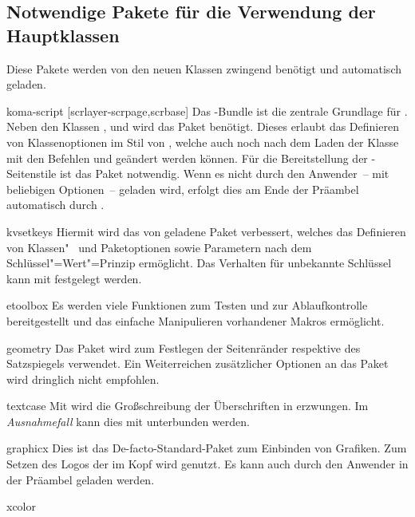 \subsection{Notwendige Pakete für die Verwendung der Hauptklassen}
Diese Pakete werden von den neuen Klassen zwingend benötigt und automatisch 
geladen.
%
\begin{packages}
\item[koma-script][scrlayer-scrpage,scrbase]
  Das \KOMAScript-Bundle ist die zentrale Grundlage für \TUDScript. Neben den 
  Klassen ,  und  wird das Paket 
   benötigt. Dieses erlaubt das Definieren von Klassenoptionen 
  im Stil von \KOMAScript, welche auch noch nach dem Laden der Klasse mit den 
  Befehlen  und  geändert werden können. Für 
  die Bereitstellung der -Seitenstile ist das Paket 
   notwendig. Wenn es nicht durch den Anwender~-- mit 
  beliebigen Optionen~-- geladen wird, erfolgt dies am Ende der Präambel 
  automatisch durch \TUDScript.
\item[kvsetkeys]
  Hiermit wird das von  geladene Paket  
  verbessert, welches das Definieren von Klassen"~ und Paketoptionen sowie 
  Parametern nach dem Schlüssel"=Wert"=Prinzip ermöglicht. Das Verhalten für 
  unbekannte Schlüssel  kann mit  festgelegt werden.
\item[etoolbox]
  Es werden viele Funktionen zum Testen und zur Ablaufkontrolle bereitgestellt 
  und das einfache Manipulieren vorhandener Makros ermöglicht.
\item[geometry]
  Das Paket wird zum Festlegen der Seitenränder respektive des Satzspiegels 
  verwendet. Ein Weiterreichen zusätzlicher Optionen an das Paket wird 
  dringlich nicht empfohlen.
\item[textcase]
  Mit  wird die Großschreibung der Überschriften in 
  \DIN erzwungen. Im \emph{Ausnahmefall} kann dies mit  
  unterbunden werden.
\item[graphicx]
  Dies ist das De-facto-Standard-Paket zum Einbinden von Grafiken. Zum Setzen 
  des Logos der \TnUD im Kopf wird  genutzt. Es kann 
  auch durch den Anwender in der Präambel geladen werden.
\item[xcolor]

\end{packages}
